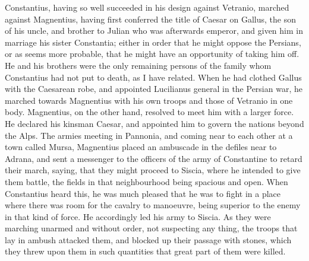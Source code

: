 Constantius, having so well succeeded in his design against Vetranio, marched against Magnentius, having first conferred the title of Caesar on Gallus, the son of his uncle, and brother to Julian who was afterwards emperor, and given him in marriage his sister Constantia; either in order that he might oppose the Persians, or as seems more probable, that he might have an opportunity of taking him off. He and his brothers were the only remaining persons of the family whom Constantius had not put to death, as I have related. When he had clothed Gallus with the Caesarean robe, and appointed Lucilianus general in the Persian war, he marched towards Magnentius with his own troops and those of Vetranio in one body. Magnentius, on the other hand, resolved to meet him with a larger force. He declared his kinsman Caesar, and appointed him to govern the nations beyond the Alps. The armies meeting in Pannonia, and coming near to each other at a town called Mursa, Magnentius placed an ambuscade in the defiles near to Adrana, and sent a messenger to the officers of the army of Constantine to retard their march, saying, that they might proceed to Siscia, where he intended to give them battle, the fields in that neighbourhood being spacious and open. When Constantius heard this, he was much pleased that he was to fight in a place where there was room for the cavalry to manoeuvre, being superior to the enemy in that kind of force. He accordingly led his army to Siscia. As they were marching unarmed and without order, not suspecting any thing, the troops that lay in ambush attacked them, and blocked up their passage with stones, which they threw upon them in such quantities that great part of them were killed.

